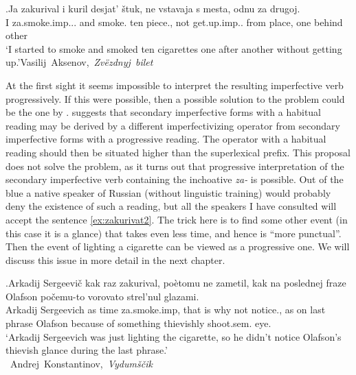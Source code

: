 \exg.\label{ex:zakurivat1}Ja zakurival i kuril desjat' \v{s}tuk, ne vstavaja s mesta, odnu za drugoj.\\
I za.smoke.imp... and smoke. ten piece., not get.up.imp.. from place, one behind other\\
\trans `I started to smoke and smoked ten cigarettes one after another without getting up.'\hbox{}\hfill\hbox{Vasilij Aksenov, \textit{Zv\"{e}zdnyj bilet}}

At the first sight it seems impossible to interpret the resulting imperfective verb progressively. If this were possible, then a possible solution to the problem could be the one by \citet{Ramchand:04}. \citet{Ramchand:04} suggests that secondary imperfective forms with a habitual reading may be derived by a different imperfectivizing operator from secondary imperfective forms with a progressive reading. The operator with a habitual reading should then be situated higher than the superlexical prefix. This proposal does not solve the problem, as it turns out that progressive interpretation of the secondary imperfective verb containing the inchoative \textit{za-} is possible. Out of the blue a native speaker of Russian (without linguistic training) would probably deny the existence of such a reading, but all the speakers I have consulted will accept the sentence \ref{ex:zakurivat2}. The trick here is to find some other event (in this case it is a glance) that takes even less time, and hence is ``more punctual''. Then the event of lighting a cigarette can be viewed as a progressive one. We will discuss this issue in more detail in the next chapter.

\exg.\label{ex:zakurivat2}Arkadij Sergeevi\v{c} kak raz zakurival, po\`{e}tomu ne zametil, kak na poslednej fraze Olafson po\v{c}emu-to vorovato strel'nul glazami.\\
Arkadij Sergeevich as time za.smoke.imp, {that is why} not notice., as on last phrase Olafson {because of something} thievishly shoot.sem. eye.\\
\trans `Arkadij Sergeevich was just lighting the cigarette, so he didn't notice Olafson's thievish glance during the last phrase.'\\\hbox{}\hfill\hbox{
Andrej Konstantinov, \textit{Vydum\v{s}\v{c}ik}}

